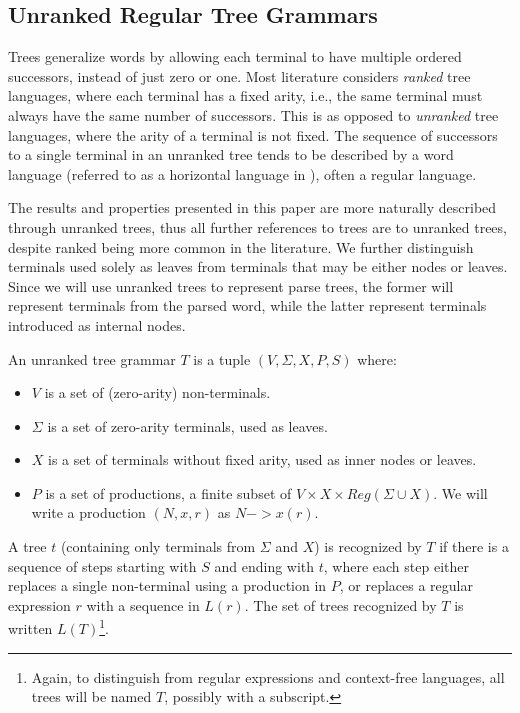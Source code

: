 \documentclass[acmsmall,review,anonymous]{acmart}\settopmatter{printfolios=true,printccs=false,printacmref=false}
\newcommand{\NT}{V} %
\newcommand{\T}{\Sigma} %
\newcommand{\regex}{\mathit{Reg}}
\begin{document}
\subsection{Unranked Regular Tree Grammars} \label{sec:preliminaries-trees}

Trees generalize words by allowing each terminal to have multiple ordered successors, instead of just zero or one. Most literature considers \emph{ranked} tree languages, where each terminal has a fixed arity, i.e., the same terminal must always have the same number of successors. This is as opposed to \emph{unranked} tree languages, where the arity of a terminal is not fixed. The sequence of successors to a single terminal in an unranked tree tends to be described by a word language (referred to as a horizontal language in \cite{comonTreeAutomataTechniques2007}), often a regular language.

The results and properties presented in this paper are more naturally described through unranked trees, thus all further references to trees are to unranked trees, despite ranked being more common in the literature. We further distinguish terminals used solely as leaves from terminals that may be either nodes or leaves. Since we will use unranked trees to represent parse trees, the former will represent terminals from the parsed word, while the latter represent terminals introduced as internal nodes.

An unranked tree grammar $T$ is a tuple $(\NT, \T, X, P, S)$ where:

\begin{itemize}
\item $\NT$ is a set of (zero-arity) non-terminals.
\item $\T$ is a set of zero-arity terminals, used as leaves.
\item $X$ is a set of terminals without fixed arity, used as inner nodes or leaves.
\item $P$ is a set of productions, a finite subset of $\NT \times X \times \regex(\T \cup X)$. We will write a production $(N, x, r)$ as $N -> x(r)$.
\end{itemize}

\noindent A tree $t$ (containing only terminals from $\T$ and $X$) is recognized by $T$ if there is a sequence of steps starting with $S$ and ending with $t$, where each step either replaces a single non-terminal using a production in $P$, or replaces a regular expression $r$ with a sequence in $L(r)$. The set of trees recognized by $T$ is written $L(T)$\footnote{Again, to distinguish from regular expressions and context-free languages, all trees will be named $T$, possibly with a subscript.}.
\end{document}
